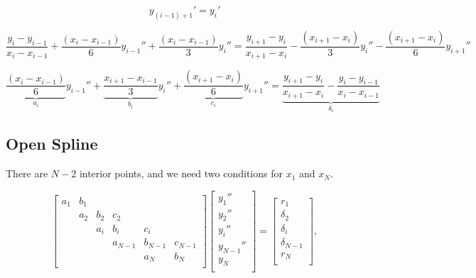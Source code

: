 \documentclass[aps,onecolumn,11pt]{revtex4}
\begin{document}
$$
	y_{(i-1)+1}' = y_i'
$$
	
\begin{equation}
		\dfrac{y_{i}-y_{i-1}}{x_{i}-x_{i-1}} + \dfrac{(x_{i} - x_{i-1})}{6} y_{i-1}'' + \dfrac{(x_{i} - x_{i-1})}{3} y_{i}''
		=
		\dfrac{y_{i+1}-y_{i}}{x_{i+1}-x_{i}} - \dfrac{(x_{i+1} - x_i)}{3} y_i'' - \dfrac{(x_{i+1} - x_i)}{6} y_{i+1}''
\end{equation}
	
\begin{equation}
  \underbrace{\dfrac{(x_{i} - x_{i-1})}{6}}_{a_i} y_{i-1}''
+ \underbrace{\dfrac{x_{i+1}-x_{i-1}}{3}}_{b_i} y_i''
+ \underbrace{\dfrac{(x_{i+1} - x_i)}{6}}_{c_i} y_{i+1}'' = 
\underbrace{\dfrac{y_{i+1}-y_{i}}{x_{i+1}-x_{i}} - \dfrac{y_{i}-y_{i-1}}{x_{i}-x_{i-1}}}_{\delta_i}
\end{equation}	
	
\subsection{Open Spline}
There are $N-2$ interior points, and we need two conditions for $x_1$ and $x_N$.

\begin{equation}
\begin{bmatrix}
a_1  & b_1 &     &         &         &         \\
     & a_2 & b_2 & c_2     &         &         \\
     &     & a_i & b_i     & c_i     &         \\
     &     &     & a_{N-1} & b_{N-1} & c_{N-1} \\
     &     &     &         &   a_N   & b_N     \\
\end{bmatrix}
\begin{bmatrix}
	y_1''\\
	y_2''\\
	y_i''\\
	y_{N-1}''\\
	y_N\\
\end{bmatrix}
 = 
 \begin{bmatrix}
 	r_1\\
	\delta_2\\
	\delta_i\\
	\delta_{N-1}\\
	r_N\\
 \end{bmatrix},
\end{equation}
\end{document}
